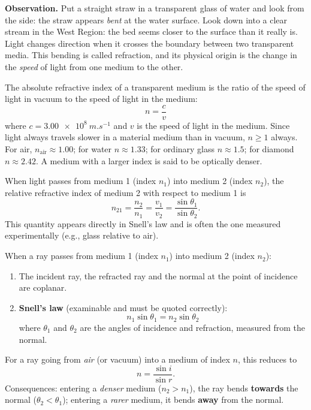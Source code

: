\documentclass[11pt]{article}
\newcommand{\cle}[1]{{\popxbold\color{popdark}#1}}
\newcounter{popsec}
\newcounter{popsub}
\newcommand{\courssub}[1]{%
  \stepcounter{popsub}%
  \par\vspace{9pt}\noindent{\popxbold\fontsize{11.5}{13}\selectfont\color{popink}{\color{poporange}\thepopsec.\thepopsub}\hspace{6pt}#1}\par\nopagebreak\vspace{4pt}
}
\begin{document}
\courssub{Refraction at a Plane Interface}

\textbf{Observation.} Put a straight straw in a transparent glass of water and look from the side: the straw appears \emph{bent} at the water surface. Look down into a clear stream in the West Region: the bed seems closer to the surface than it really is. Light changes direction when it crosses the boundary between two transparent media. This bending is called \cle{refraction}, and its physical origin is the change in the \emph{speed} of light from one medium to the other.

\begin{definition}
The \cle{absolute refractive index} of a transparent medium is the ratio of the speed of light in vacuum to the speed of light in the medium:
\[ n = \frac{c}{v} \]
where $c = \SI{3.00e8}{m.s^{-1}}$ and $v$ is the speed of light in the medium. Since light always travels slower in a material medium than in vacuum, $n \geq 1$ always. For air, $n_{\text{air}} \approx 1.00$; for water $n \approx 1.33$; for ordinary glass $n \approx 1.5$; for diamond $n \approx 2.42$. A medium with a larger index is said to be optically \cle{denser}.
\end{definition}

\begin{definition}
When light passes from medium 1 (index $n_1$) into medium 2 (index $n_2$), the \cle{relative refractive index} of medium 2 with respect to medium 1 is
\[ n_{21} = \frac{n_2}{n_1} = \frac{v_1}{v_2} = \frac{\sin\theta_1}{\sin\theta_2}. \]
This quantity appears directly in Snell's law and is often the one measured experimentally (e.g., glass relative to air).
\end{definition}

\begin{propriete}
When a ray passes from medium 1 (index $n_1$) into medium 2 (index $n_2$):
\begin{enumerate}
\item The incident ray, the refracted ray and the normal at the point of incidence are coplanar.
\item \textbf{Snell's law} (examinable and must be quoted correctly):
\[ n_1 \sin\theta_1 = n_2 \sin\theta_2 \]
where $\theta_1$ and $\theta_2$ are the angles of incidence and refraction, measured from the normal.
\end{enumerate}
For a ray going from \emph{air} (or vacuum) into a medium of index $n$, this reduces to
\[ n = \frac{\sin i}{\sin r}. \]
Consequences: entering a \emph{denser} medium ($n_2 > n_1$), the ray bends \textbf{towards} the normal ($\theta_2 < \theta_1$); entering a \emph{rarer} medium, it bends \textbf{away} from the normal.
\end{propriete}
\end{document}
